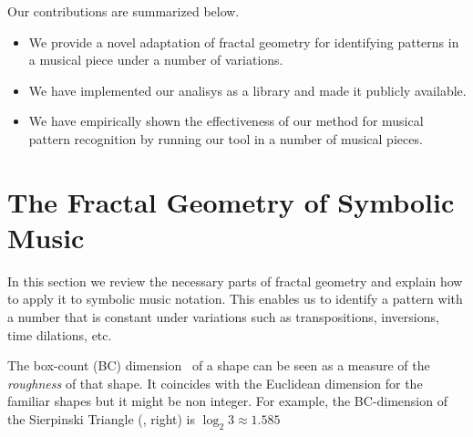 




  Our contributions are summarized below.

\begin{itemize}
  \item We provide a novel adaptation of fractal geometry for identifying patterns
        in a musical piece under a number of variations.
  \item We have implemented our analisys as a library and made it publicly available.
  \item We have empirically shown the effectiveness of our method for musical pattern
        recognition by running our tool in a number of musical pieces.
\end{itemize}

\section{The Fractal Geometry of Symbolic Music}
\label{sec:fractal-geom}

  In this section we review the necessary parts of fractal geometry
and explain how to apply it to symbolic music notation. This enables
us to identify a pattern with a number that is constant under
variations such as transpositions, inversions, time dilations, etc.

  The box-count (BC) dimension~\cite{bouligand1928ensembles} of a shape
can be seen as a measure of the \emph{roughness} of that shape. It coincides with the
Euclidean dimension for the familiar shapes but it might be non integer. For example,
the BC-dimension of the Sierpinski Triangle (, right) is $\log_2 3 \approx 1.585$

